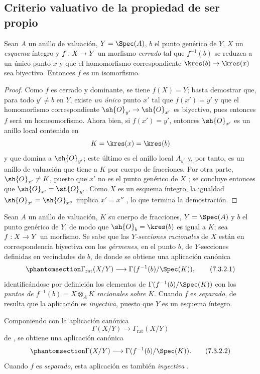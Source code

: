 \documentclass[oneside,10pt]{amsart}
\makeatletter
\newcommand{\ega@arrow}[2]{\mathchoice{#1}{#2}{#2}{#2}}
\renewcommand{\to}{\ega@arrow{\longrightarrow}{\rightarrow}}
\newcommand{\oldpage}[2][]{\marginnote{\normalfont\footnotesize\textbf{#1}~|~#2}\ignorespaces}
\let\EGAOriginalLabel\label
\renewcommand{\label}[1]{\phantomsection\EGAOriginalLabel{#1}}
\makeatother
\begin{document}

\oldpage[II]{143}

\subsection{Criterio valuativo de la propiedad de ser propio}
\label{subsection:II.7.3}

\begin{proposition}[7.3.1]
\label{II.7.3.1}
Sean $A$ un anillo de valuación, $Y=\Spec(A)$, $b$ el punto genérico de $Y$, $X$ un \emph{esquema} íntegro y $f:X\to Y$ un morfismo \emph{cerrado} tal que $f^{-1}(b)$ se reduzca a un único punto $x$ y que el homomorfismo correspondiente $\kres(b)\to\kres(x)$ sea biyectivo.
Entonces $f$ es un isomorfismo.
\end{proposition}

\begin{proof}
Como $f$ es cerrado y dominante, se tiene $f(X)=Y$;
basta  demostrar que, para todo $y'\neq b$ en $Y$, existe \emph{un único} punto $x'$ tal que $f(x')=y'$ y que el homomorfismo correspondiente $\sh{O}_{y'}\to\sh{O}_{x'}$ es biyectivo, pues entonces $f$ será un homeomorfismo.
Ahora bien, si $f(x')=y'$, entonces $\sh{O}_{x'}$ es un anillo local contenido en
\[
  K=\kres(x)=\kres(b)
\]
y que domina a $\sh{O}_{y'}$;
este último es el anillo local $A_{y'}$ y, por tanto, es un anillo de valuación  que tiene a $K$ por cuerpo de fracciones.
Por otra parte, $\sh{O}_{x'}\neq K$, puesto que $x'$ no es el punto genérico de $X$ ;
se concluye entonces que $\sh{O}_{x'}=\sh{O}_{y'}$.
Como $X$ es un esquema íntegro, la igualdad $\sh{O}_{x'}=\sh{O}_{x''}$ implica $x'=x''$ , lo que termina la demostración.
\end{proof}

\begin{env}[7.3.2]
\label{II.7.3.2}
Sean $A$ un anillo de valuación, $K$ su cuerpo de fracciones, $Y=\Spec(A)$ y $b$ el punto genérico de $Y$, de modo que $\sh{O}_b=\kres(b)$ es igual a $K$;
sea $f:X\to Y$ un morfismo.
Se sabe  que las \emph{$Y$-secciones racionales} de $X$ están en correspondencia biyectiva con los \emph{gérmenes}, en el punto $b$, de $Y$-secciones definidas en vecindades de $b$, de donde se obtiene una aplicación canónica
\[
\label{II.7.3.2.1}
  \Gamma_\mathrm{rat}(X/Y)\longrightarrow
  \Gamma(f^{-1}(b)/\Spec(K)),
\tag{7.3.2.1}
\]
identificándose por definición  los elementos de $\Gamma(f^{-1}(b)/\Spec(K))$ con los \emph{puntos de $f^{-1}(b)=X\otimes_A K$ racionales sobre $K$}.
Cuando $f$ es \emph{separado}, de  resulta que la aplicación  es \emph{inyectiva}, puesto que $Y$ es un esquema íntegro.

Componiendo  con la aplicación canónica
\[
  \Gamma(X/Y)\longrightarrow\Gamma_\mathrm{rat}(X/Y)
\]
de , se obtiene una aplicación canónica
\[
\label{II.7.3.2.2}
  \Gamma(X/Y)\longrightarrow
  \Gamma(f^{-1}(b)/\Spec(K)).
\tag{7.3.2.2}
\]
Cuando $f$ es \emph{separado}, esta aplicación es también \emph{inyectiva} .
\end{env}
\end{document}
